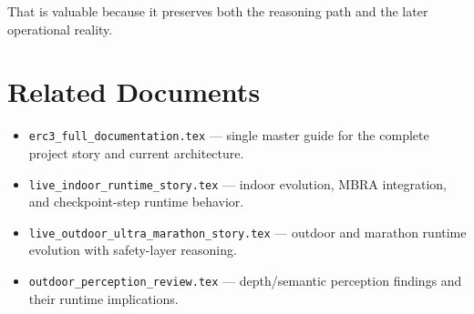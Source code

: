 \documentclass[11pt,a4paper]{article}
\begin{document}
That is valuable because it preserves both the reasoning path and the later operational reality.


\section{Related Documents}
\begin{itemize}
  \item \texttt{erc3\_full\_documentation.tex} --- single master guide for the complete project story and current architecture.
  \item \texttt{live\_indoor\_runtime\_story.tex} --- indoor evolution, MBRA integration, and checkpoint-step runtime behavior.
  \item \texttt{live\_outdoor\_ultra\_marathon\_story.tex} --- outdoor and marathon runtime evolution with safety-layer reasoning.
  \item \texttt{outdoor\_perception\_review.tex} --- depth/semantic perception findings and their runtime implications.
\end{itemize}
\end{document}
